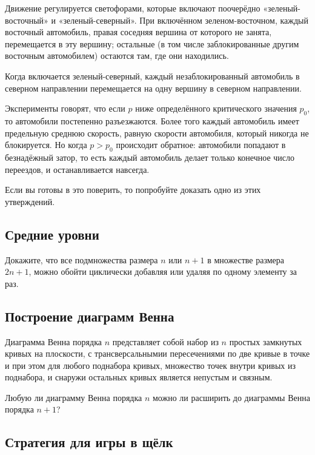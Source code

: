 Движение регулируется светофорами, которые включают поочерёдно «зеленый-восточный» и «зеленый-северный».
При включённом зеленом-восточном, каждый восточный автомобиль, правая соседняя вершина от которого не занята, перемещается в эту вершину; остальные (в том числе заблокированные другим восточным автомобилем) остаются там, где они находились.

Когда включается зеленый-северный, каждый незаблокированный автомобиль в северном направлении перемещается на одну вершину в северном направлении.

Эксперименты говорят, что если $p$ ниже определённого критического значения $p_0$,
то автомобили постепенно разъезжаются.
Более того каждый автомобиль имеет предельную среднюю скорость, равную скорости автомобиля, который никогда не блокируется.
Но когда $p> p_0$ происходит обратное: автомобили попадают в безнадёжный затор, то есть каждый автомобиль делает только конечное число переездов, и останавливается навсегда.

Если вы готовы в это поверить, то попробуйте доказать одно из этих утверждений.

\subsection*{Средние уровни}

Докажите, что все подмножества размера $n$ или $n+1$ в множестве размера $2n+1$, можно обойти циклически добавляя или удаляя по одному элементу за раз.

\subsection*{Построение диаграмм Венна}

Диаграмма Венна порядка $n$ представляет собой набор из $n$ простых замкнутых кривых на плоскости, с трансверсальнымии пересечениями  по две кривые в точке и при этом для любого поднабора кривых, множество точек внутри кривых из поднабора, и снаружи остальных кривых является непустым и связным.

Любую ли диаграмму Венна порядка $n$ можно ли расширить до диаграммы Венна порядка $n+1$?

\subsection*{Стратегия для игры в щёлк}

